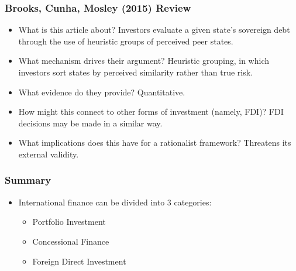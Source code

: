 \documentclass[handout]{beamer}
\begin{document}
		
		
		

\begin{frame} 
	\frametitle{\LARGE{Brooks, Cunha, Mosley (2015) Review}}
	\begin{itemize}
		\item What is this article about? \pause Investors evaluate a given state's sovereign debt through the use of heuristic groups of perceived peer states. 
		
		\item What mechanism drives their argument? \pause Heuristic grouping, in which investors sort states by perceived similarity rather than true risk.
		
		\item What evidence do they provide? \pause Quantitative.
		
		\item How might this connect to other forms of investment (namely, FDI)? \pause FDI decisions may be made in a similar way.
		
		\item What implications does this have for a rationalist framework? \pause Threatens its external validity.
	\end{itemize}
\end{frame}

\begin{frame} 
\frametitle{\LARGE{Summary}}
\begin{itemize}
	\item International finance can be divided into 3 categories: 
	\begin{itemize}
		\item Portfolio Investment
		\item Concessional Finance 
		\item Foreign Direct Investment
	\end{itemize} 
\end{itemize}
\end{frame}
\end{document}
